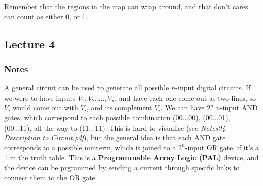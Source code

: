 \documentclass[a4paper, 12pt]{article}
\begin{document}
                Remember that the regions in the map can wrap around, and that don't cares can count as either 0, or 1.
        \subsection*{Lecture 4}
            \subsubsection*{Notes}
                A general circuit can be used to generate all possible $n$-input digital circuits. If we were to have inputs $V_1, V_2, ..., V_n$, and have each one come out as two lines, so $V_i$ would come out with $V_i$, and its complement $V_i^\prime$. We can have $2^n$ $n$-input AND gates, which correspond to each possible combination (00...00), (00...01), (00...11), all the way to (11...11). This is hard to visualise (see \textit{Notes04 - Description to Circuit.pdf}), but the general idea is that each AND gate corresponds to a possible minterm, which is joined to a $2^n$-input OR gate, if it's a 1 in the truth table. This is a \textbf{Programmable Array Logic (PAL)} device, and the device can be prgrammed by sending a current through specific links to connect them to the OR gate.
                \medskip
\end{document}
